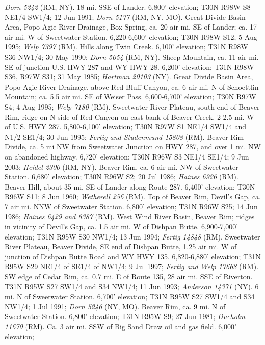 \textit{Dorn 5242} (RM, NY).
18 mi. SSE of Lander. 6,800' elevation; T30N R98W S8 NE1/4 SW1/4; 12 Jun 1991;
\textit{Dorn 5177} (RM, NY, MO).
Great Divide Basin Area, Popo Agie River Drainage, Box Spring, ca. 20 air mi.
SE of Lander; ca. 17 air mi. W of Sweetwater Station. 6,220-6,600' elevation;
T30N R98W S12; 5 Aug 1995; \textit{Welp 7397} (RM).
Hills along Twin Creek. 6,100' elevation; T31N R98W S36 NW1/4; 30 May 1990;
\textit{Dorn 5054} (RM, NY).
Sheep Mountain, ca. 11 air mi. SE of junction U.S. HWY 287 and WY HWY 28.
6,200' elevation; T31N R98W S36, R97W S31; 31 May 1985;
\textit{Hartman 20103} (NY).
Great Divide Basin Area, Popo Agie River Drainage, above Red Bluff Canyon, ca.
6 air mi. N of Schoettlin Mountain; ca. 5.5 air mi. SE of Weiser Pass.
6,600-6,700' elevation; T30N R97W S4; 4 Aug 1995; \textit{Welp 7180} (RM).
Sweetwater River Plateau, south end of Beaver Rim, ridge on N side of Red Canyon
on east bank of Beaver Creek, 2-2.5 mi. W of U.S. HWY 287. 5,800-6,100' elevation;
T30N R97W S1 NE1/4 SW1/4 and N1/2 SE1/4; 30 Jun 1995;
\textit{Fertig and Studenmund 15808} (RM).
Beaver Rim Divide, ca. 5 mi NW from Sweetwater Junction on HWY 287, and over 1
mi. NW on abandoned highway. 6,720' elevation; T30N R96W S3 NE1/4 SE1/4;
9 Jun 2003; \textit{Heidel 2300} (RM, NY).
Beaver Rim, ca. 6 air mi. NW of Sweetwater Station. 6,680' elevation;
T30N R96W S2; 20 Jul 1986; \textit{Haines 6926} (RM).
Beaver Hill, about 35 mi. SE of Lander along Route 287. 6,400' elevation;
T30N R96W S11; 8 Jun 1960; \textit{Wetherell 256} (RM).
Top of Beaver Rim, Devil's Gap, ca. 7 air mi. NNW of Sweetwater Station.
6,800' elevation; T31N R96W S25; 14 Jun 1986;
\textit{Haines 6429 and 6387} (RM).
West Wind River Basin, Beaver Rim; ridges in vicinity of Devil's Gap,
ca. 1.5 air mi. W of Dishpan Butte. 6,900-7,000' elevation; T31N R95W S30 NW1/4;
13 Jun 1994; \textit{Fertig 14848} (RM).
Sweetwater River Plateau, Beaver Divide, SE end of Dishpan Butte, 1.25 air mi.
W of junction of Dishpan Butte Road and WY HWY 135. 6,820-6,880' elevation;
T31N R95W S29 NE1/4 of SE1/4 of NW1/4; 9 Jul 1997;
\textit{Fertig and Welp 17668} (RM).
SW edge of Cedar Rim, ca. 0.7 mi. E of Route 135, 28 air mi. SSE of Riverton.
T31N R95W S27 SW1/4 and S34 NW1/4; 11 Jun 1993; \textit{Anderson 14371} (NY).
6 mi. N of Sweetwater Station. 6,700' elevation; T31N R95W S27 SW1/4 and S34
NW1/4; 1 Jul 1991; \textit{Dorn 5246} (NY, MO).
Beaver Rim, ca. 9 mi. N of Sweetwater Station. 6,800' elevation; T31N R95W S9;
27 Jun 1981; \textit{Dueholm 11670} (RM).
Ca. 3 air mi. SSW of Big Sand Draw oil and gas field. 6,000' elevation;
